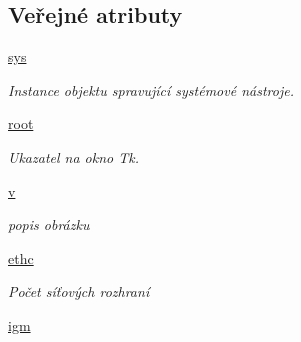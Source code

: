 \subsection*{Veřejné atributy}
\begin{DoxyCompactItemize}
\item 
\hypertarget{classcloseSetup_1_1App_a29e3a5f52ef638873f13f1e1dc3b03f2}{\hyperlink{classcloseSetup_1_1App_a29e3a5f52ef638873f13f1e1dc3b03f2}{sys}}\label{df/df9/classcloseSetup_1_1App_a29e3a5f52ef638873f13f1e1dc3b03f2}

\begin{DoxyCompactList}\small\item\em Instance objektu spravující systémové nástroje. \end{DoxyCompactList}\item 
\hypertarget{classcloseSetup_1_1App_aa89fd74d63463734d14e222fe2296815}{\hyperlink{classcloseSetup_1_1App_aa89fd74d63463734d14e222fe2296815}{root}}\label{df/df9/classcloseSetup_1_1App_aa89fd74d63463734d14e222fe2296815}

\begin{DoxyCompactList}\small\item\em Ukazatel na okno Tk. \end{DoxyCompactList}\item 
\hypertarget{classcloseSetup_1_1App_a5c27a170502be05b69f25e5e2bd05ef5}{\hyperlink{classcloseSetup_1_1App_a5c27a170502be05b69f25e5e2bd05ef5}{v}}\label{df/df9/classcloseSetup_1_1App_a5c27a170502be05b69f25e5e2bd05ef5}

\begin{DoxyCompactList}\small\item\em popis obrázku \end{DoxyCompactList}\item 
\hypertarget{classcloseSetup_1_1App_a8d30b3f58f498caf6da5a5df32f8b24a}{\hyperlink{classcloseSetup_1_1App_a8d30b3f58f498caf6da5a5df32f8b24a}{ethc}}\label{df/df9/classcloseSetup_1_1App_a8d30b3f58f498caf6da5a5df32f8b24a}

\begin{DoxyCompactList}\small\item\em Počet síťových rozhraní \end{DoxyCompactList}\item 
\hypertarget{classcloseSetup_1_1App_af865322161774fe99b14bb037fa9dc87}{\hyperlink{classcloseSetup_1_1App_af865322161774fe99b14bb037fa9dc87}{igm}}\label{df/df9/classcloseSetup_1_1App_af865322161774fe99b14bb037fa9dc87}


\end{DoxyCompactItemize}
